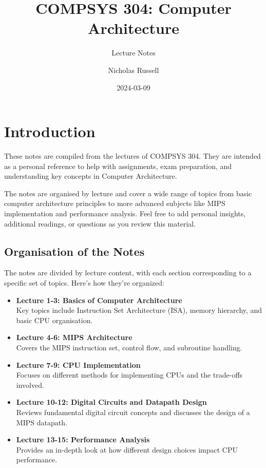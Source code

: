\documentclass[
  12pt,
  a4paper,
]{report}
\title{COMPSYS 304: Computer Architecture}
\subtitle{Lecture Notes}
\author{Nicholas Russell}
\date{2024-03-09}
\renewcommand*\contentsname{Table of contents}
\newcommand\contentsname{Table of contents}
\begin{document}
\maketitle

\renewcommand*\contentsname{Table of contents}
{
\hypersetup{linkcolor=}
\setcounter{tocdepth}{2}
\tableofcontents
}


\chapter*{Introduction}\label{introduction}


These notes are compiled from the lectures of COMPSYS 304. They are
intended as a personal reference to help with assignments, exam
preparation, and understanding key concepts in Computer Architecture.

The notes are organised by lecture and cover a wide range of topics from
basic computer architecture principles to more advanced subjects like
MIPS implementation and performance analysis. Feel free to add personal
insights, additional readings, or questions as you review this material.

\section*{Organisation of the Notes}\label{organisation-of-the-notes}


The notes are divided by lecture content, with each section
corresponding to a specific set of topics. Here's how they're organized:

\begin{itemize}
\item
  \textbf{Lecture 1-3: Basics of Computer Architecture}\\
  Key topics include Instruction Set Architecture (ISA), memory
  hierarchy, and basic CPU organisation.
\item
  \textbf{Lecture 4-6: MIPS Architecture}\\
  Covers the MIPS instruction set, control flow, and subroutine
  handling.
\item
  \textbf{Lecture 7-9: CPU Implementation}\\
  Focuses on different methods for implementing CPUs and the trade-offs
  involved.
\item
  \textbf{Lecture 10-12: Digital Circuits and Datapath Design}\\
  Reviews fundamental digital circuit concepts and discusses the design
  of a MIPS datapath.
\item
  \textbf{Lecture 13-15: Performance Analysis}\\
  Provides an in-depth look at how different design choices impact CPU
  performance.
\end{itemize}
\end{document}
